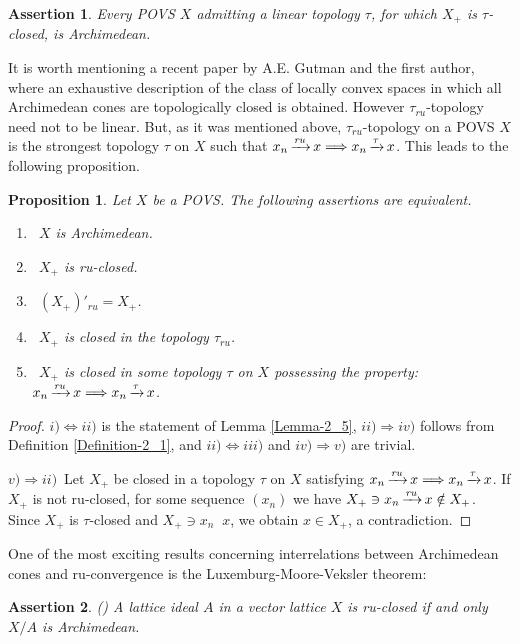 \documentclass[10pt]{article}
\newtheorem{proposition}{Proposition}[section]
\newtheorem{assertion}{Assertion}[section]
\DeclareMathOperator{\convr}{\xrightarrow[]{{\it ru}}}
\DeclareMathOperator{\convtau}{\xrightarrow[]{\tau}}
\begin{document}
\begin{assertion}\label{Assertion-2_1}
Every POVS $X$ admitting a linear topology $\tau$, for which $X_+$ is $\tau$-closed, is Archimedean.
\end{assertion}

\noindent
It is worth mentioning a recent paper \cite{GE-2023} by A.E. Gutman and the first author,
where an exhaustive description of the class of locally convex spaces in which all Archimedean cones are topologically closed is obtained.
However $\tau_{ru}$-topology need not to be linear. But, as it was men\-tion\-ed above,
$\tau_{ru}$-topology on a POVS $X$ is the strongest topology $\tau$ on $X$ such that $x_n\convr x\Longrightarrow x_n\convtau x$.
This leads to the following proposition.

\begin{proposition}\label{Proposition-2_1}
Let $X$ be a POVS. The following assertions are equivalent.
\begin{enumerate}[$i)$]
\item\
$X$ is Archimedean.
\item\
$X_+$ is ru-closed.
\item\
$(X_+)'_{ru}=X_+$.
\item\
$X_+$ is closed in the topology $\tau_{ru}$.
\item\
$X_+$ is closed in some topology $\tau$ on $X$ possessing the property: $x_n\convr x\Longrightarrow x_n\convtau x$.
\end{enumerate}
\end{proposition}

\begin{proof}
$i)\iff ii)$ is the statement of Lemma \ref{Lemma-2_5}, $ii)\Longrightarrow iv)$ follows from Definition \ref{Definition-2_1}, and $ii)\iff iii)$ and $iv)\Longrightarrow v)$ are trivial.

\medskip
$v)\Longrightarrow ii)$\
Let $X_+$ be closed in a topology $\tau$ on $X$ satisfying $x_n\convr x\Longrightarrow x_n\convtau x$.
If $X_+$ is not ru-closed, for some sequence $(x_n)$ we have $X_+\ni x_n\convr x\notin X_+$.
Since $X_+$ is $\tau$-closed and $X_+\ni x_n\convtau x$, we obtain $x\in X_+$, a contradiction.
\end{proof}

One of the most exciting results concerning interrelations between Archimedean 
cones and ru-convergence is the Luxemburg-Moore-Veksler theorem:

\begin{assertion}\label{Assertion-2_2}
{\em (\cite{LM-1967,Veksler-1966})}
A lattice ideal $A$ in a vector lattice $X$ is ru-closed if and only $X/A$ is Archimedean. 
\end{assertion}
\end{document}
